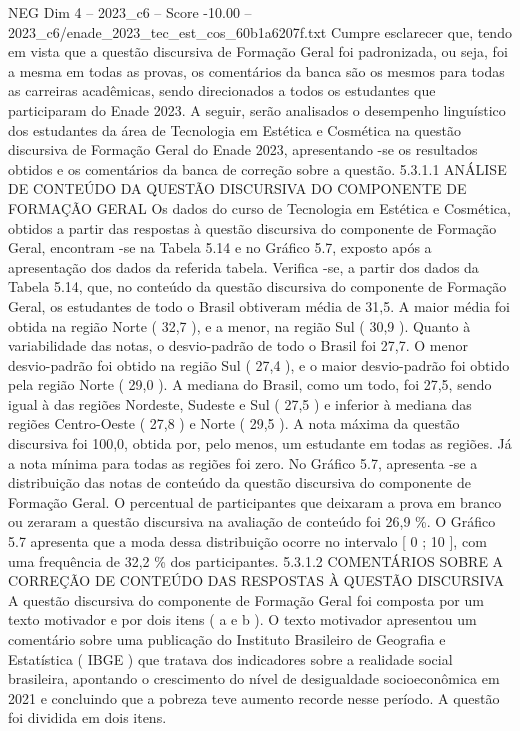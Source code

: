 \begin{textsample}{NEG Dim 4 – 2023\_c6 – Score -10.00 – 2023\_c6/enade\_2023\_tec\_est\_cos\_60b1a6207f.txt}
Cumpre esclarecer que, tendo em vista que a questão discursiva de Formação Geral foi padronizada, ou seja, foi a mesma em todas as provas, os comentários da banca são os mesmos para todas as carreiras acadêmicas, sendo direcionados a todos os estudantes que participaram do Enade 2023.
A seguir, serão analisados o desempenho linguístico dos estudantes da área de Tecnologia em Estética e Cosmética na questão discursiva de Formação Geral do Enade 2023, apresentando -se os resultados obtidos e os comentários da banca de correção sobre a questão. 5.3.1.1 ANÁLISE DE CONTEÚDO DA QUESTÃO DISCURSIVA DO COMPONENTE DE FORMAÇÃO GERAL Os dados do curso de Tecnologia em Estética e Cosmética, obtidos a partir das respostas à questão discursiva do componente de Formação Geral, encontram -se na Tabela 5.14 e no Gráfico 5.7, exposto após a apresentação dos dados da referida tabela.
Verifica -se, a partir dos dados da Tabela 5.14, que, no conteúdo da questão discursiva do componente de Formação Geral, os estudantes de todo o Brasil obtiveram média de 31,5.
A maior média foi obtida na região Norte ( 32,7 ), e a menor, na região Sul ( 30,9 ).
Quanto à variabilidade das notas, o desvio-padrão de todo o Brasil foi 27,7.
O menor desvio-padrão foi obtido na região Sul ( 27,4 ), e o maior desvio-padrão foi obtido pela região Norte ( 29,0 ).
A mediana do Brasil, como um todo, foi 27,5, sendo igual à das regiões Nordeste, Sudeste e Sul ( 27,5 ) e inferior à mediana das regiões Centro-Oeste ( 27,8 ) e Norte ( 29,5 ).
A nota máxima da questão discursiva foi 100,0, obtida por, pelo menos, um estudante em todas as regiões.
Já a nota mínima para todas as regiões foi zero.
No Gráfico 5.7, apresenta -se a distribuição das notas de conteúdo da questão discursiva do componente de Formação Geral.
O percentual de participantes que deixaram a prova em branco ou zeraram a questão discursiva na avaliação de conteúdo foi 26,9 \%.
O Gráfico 5.7 apresenta que a moda dessa distribuição ocorre no intervalo [ 0 ; 10 ], com uma frequência de 32,2 \% dos participantes. 5.3.1.2 COMENTÁRIOS SOBRE A CORREÇÃO DE CONTEÚDO DAS RESPOSTAS À QUESTÃO DISCURSIVA A questão discursiva do componente de Formação Geral foi composta por um texto motivador e por dois itens ( a e b ).
O texto motivador apresentou um comentário sobre uma publicação do Instituto Brasileiro de Geografia e Estatística ( IBGE ) que tratava dos indicadores sobre a realidade social brasileira, apontando o crescimento do nível de desigualdade socioeconômica em 2021 e concluindo que a pobreza teve aumento recorde nesse período.
A questão foi dividida em dois itens.

\end{textsample}
